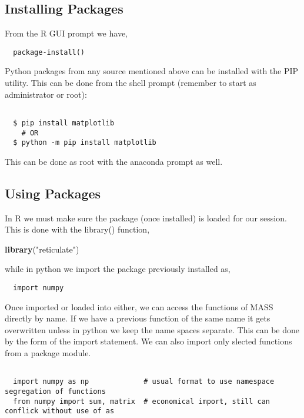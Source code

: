 \documentclass[]{book}
\newenvironment{Shaded}{\begin{snugshade}}{\end{snugshade}}
\newcommand{\KeywordTok}[1]{\textcolor[rgb]{0.13,0.29,0.53}{\textbf{#1}}}
\newcommand{\StringTok}[1]{\textcolor[rgb]{0.31,0.60,0.02}{#1}}
\newcommand{\NormalTok}[1]{#1}
\theoremstyle{definition}
\theoremstyle{definition}
\theoremstyle{definition}
\theoremstyle{remark}
\begin{document}
\subsection{Installing Packages}\label{installing-packages}

From the R GUI prompt we have,

\begin{verbatim}
  package-install()
\end{verbatim}

Python packages from any source mentioned above can be installed with
the PIP utility. This can be done from the shell prompt (remember to
start as administrator or root):

\begin{verbatim}

  $ pip install matplotlib  
    # OR
  $ python -m pip install matplotlib
\end{verbatim}

This can be done as root with the anaconda prompt as well.

\subsection{Using Packages}\label{using-packages}

In R we must make sure the package (once installed) is loaded for our
session. This is done with the library() function,

\begin{Shaded}
\begin{Highlighting}[]
  \KeywordTok{library}\NormalTok{(}\StringTok{"reticulate"}\NormalTok{)}
\end{Highlighting}
\end{Shaded}

while in python we import the package previously installed as,

\begin{verbatim}
  import numpy
\end{verbatim}

Once imported or loaded into either, we can access the functions of MASS
directly by name. If we have a previous function of the same name it
gets overwritten unless in python we keep the name spaces separate. This
can be done by the form of the import statement. We can also import only
slected functions from a package module.

\begin{verbatim}

  import numpy as np             # usual format to use namespace segregation of functions
  from numpy import sum, matrix  # economical import, still can conflick without use of as
  
\end{verbatim}
\end{document}
